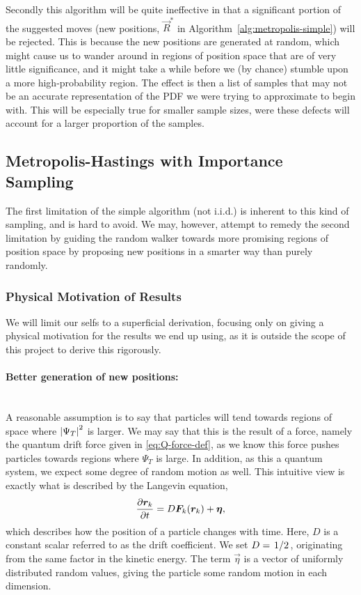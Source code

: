 \documentclass[twocolumn]{article}
\begin{document}
Secondly this algorithm will be quite ineffective in that a significant portion
of the suggested moves (new positions, $\vec R^*$ in
Algorithm~\ref{alg:metropolis-simple}) will be rejected. This is because the new
positions are generated at random, which might cause us to wander around in
regions of position space that are of very little significance, and it might
take a while before we (by chance) stumble upon a more high-probability region.
The effect is then a list of samples that may not be an accurate representation
of the PDF we were trying to approximate to begin with. This will be especially
true for smaller sample sizes, were these defects will account for a larger
proportion of the samples.


\subsection{Metropolis-Hastings with Importance Sampling}
The first limitation of the simple algorithm (not i.i.d.) is inherent to this
kind of sampling, and is hard to avoid. We may, however, attempt to remedy the
second limitation by guiding the random walker towards more promising regions of
position space by proposing new positions in a smarter way than purely randomly.

\subsubsection{Physical Motivation of Results}
We will limit our selfs to a superficial derivation, focusing only on giving a
physical motivation for the results we end up using, as it is outside the scope
of this project to derive this rigorously.

\paragraph{Better generation of new positions:}$\,$\\
A reasonable assumption is to say that particles will tend towards regions of
space where $\abs{\Psi_T}^2$ is larger. We may say that this is the result of a
force, namely the quantum drift force given in \eqref{eq:Q-force-def}, as we
know this force pushes particles towards regions where $\Psi_T$ is large. In
addition, as this a quantum system, we expect some degree of random motion as
well. This intuitive view is exactly what is described by
the Langevin equation,
\begin{align}
    \pdv{\bm r_k}{t} = D\bm F_k(\bm r_k) + \bm\eta,\label{eq:Langevin}
\end{align}
which describes how the position of a particle changes with time. Here, $D$ is
a constant scalar referred to as the drift coefficient. We set
$D=\flatfrac{1}{2}$, originating from the same factor in the kinetic energy. The
term $\vec\eta$ is a vector of
uniformly distributed random values, giving the particle some random motion in each
dimension.
\end{document}
